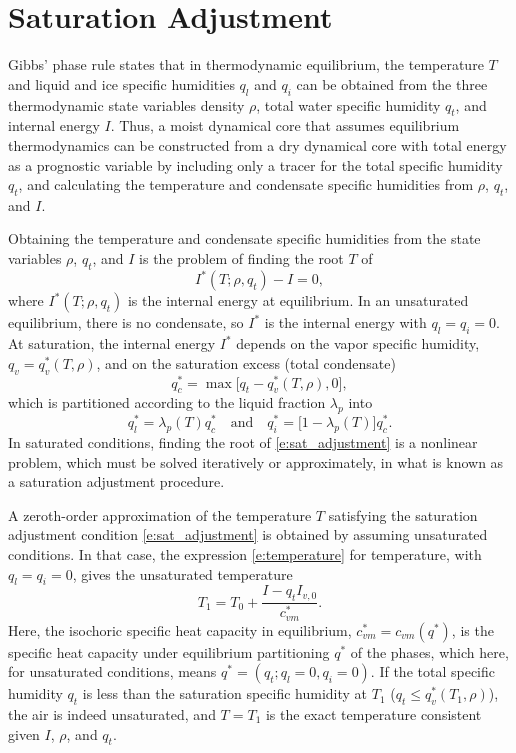 \documentclass{report}
\begin{document}
\section{Saturation Adjustment}
\label{sct:sat_adj}
Gibbs' phase rule states that in thermodynamic equilibrium, the temperature $T$ and liquid and ice specific humidities $q_l$ and $q_i$ can be obtained from the three thermodynamic state variables density $\rho$, total water specific humidity $q_t$, and internal energy $I$. Thus, a moist dynamical core that assumes equilibrium thermodynamics can be constructed from a dry dynamical core with total energy as a prognostic variable by including only a tracer for the total specific humidity $q_t$, and calculating the temperature and condensate specific humidities from $\rho$, $q_t$, and $I$. 

Obtaining the temperature and condensate specific humidities from the state variables $\rho$, $q_t$, and $I$ is the problem of finding the root $T$ of
\begin{equation}\label{e:sat_adjustment}
I^*(T; \rho, q_t) - I = 0,
\end{equation}
where $I^*(T; \rho, q_t)$ is the internal energy at equilibrium. In an unsaturated equilibrium, there is no condensate, so $I^*$ is the internal energy with $q_l=q_i=0$. At saturation, the internal energy $I^*$ depends on the vapor specific humidity, $q_v = q_v^*(T, \rho)$, and on the saturation excess (total condensate) 
\begin{equation}
q_c^* = \max\bigl[q_t - q_v^*(T, \rho), 0\bigr], 
\end{equation}
which is partitioned according to the liquid fraction $\lambda_p$ into 
\begin{equation}\label{e:phase_partition}
q_l^* = \lambda_p(T) q_c^* \quad \text{and} \quad q_i^* = \bigl[1-\lambda_p(T)\bigr]q_c^*.
\end{equation} 
In saturated conditions, finding the root of \eqref{e:sat_adjustment} is a nonlinear problem, which must be solved iteratively or approximately, in what is known as a saturation adjustment procedure. 

A zeroth-order approximation of the temperature $T$ satisfying the saturation adjustment condition \eqref{e:sat_adjustment} is obtained by assuming unsaturated conditions. In that case, the expression \eqref{e:temperature} for temperature, with $q_l=q_i=0$, gives the unsaturated temperature 
\begin{equation}
    T_1 = T_0 + \frac{I - q_t I_{v,0}}{c_{vm}^*}.
\end{equation}
Here, the isochoric specific heat capacity in equilibrium, $c_{vm}^* = c_{vm}(q^*)$, is the specific heat capacity under equilibrium partitioning $q^*$ of the phases, which here, for unsaturated conditions, means $q^*=(q_t; q_l=0, q_i=0)$. If the total specific humidity $q_t$ is less than the saturation specific humidity at $T_1$ ($q_t \le q_v^*(T_1, \rho)$), the air is indeed unsaturated, and $T=T_1$ is the exact temperature consistent given $I$, $\rho$, and $q_t$. 
\end{document}
